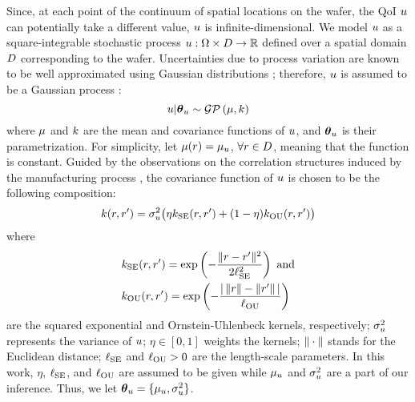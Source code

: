 Since, at each point of the continuum of spatial locations on the wafer, the QoI $u$ can potentially take a different value, $u$ is infinite-dimensional. We model $u$ as a square-integrable stochastic process $u: \Omega \times D \to \mathbb{R}$ defined over a spatial domain $D$ corresponding to the wafer. Uncertainties due to process variation are known to be well approximated using Gaussian distributions \cite{srivastava2010}; therefore, $u$ is assumed to be a Gaussian process \cite{rasmussen2006}:
\[
  \u | \vparam_\u \sim \gaussianp{\fMean}{\fCov}
\]
where $\fMean$ and $\fCov$ are the mean and covariance functions of $u$, and ${\boldsymbol\theta}_u$ is their parametrization. For simplicity, let $\fMean{\r} = \mu_\u$, $\forall r \in D$, meaning that the function is constant. Guided by the observations on the correlation structures induced by the manufacturing process \cite{cheng2011}, the covariance function of $u$ is chosen to be the following composition:
\begin{equation} \elabel{covariance-function}
  \fCov{\r, \r'} = \sigma_\u^2 \big( \eta \fCov_\SE(\r, \r') + (1 - \eta) \fCov_\OU(\r, \r') \big)
\end{equation}
where
\begin{align*}
  & \fCov_\SE(\r, \r') = \exp\left(-\frac{\norm{\r - \r'}^2}{2 \ell_\SE^2}\right) \text{ and} \\
  & \fCov_\OU(\r, \r') = \exp\left(- \frac{\abs{\,\norm{\r} - \norm{\r'}\,}}{\ell_\OU} \right)
\end{align*}
are the squared exponential and Ornstein-Uhlenbeck kernels, respectively; $\sigma_u^2$ represents the variance of $u$; $\eta \in [0, 1]$ weights the kernels; $\| \cdot \|$ stands for the Euclidean distance; $\ell_{\text{SE}}$ and $\ell_{\text{OU}} > 0$ are the length-scale parameters. In this work, $\eta$, $\ell_{\text{SE}}$, and $\ell_{\text{OU}}$ are assumed to be given while $\mu_u$ and $\sigma^2_u$ are a part of our inference. Thus, we let ${\boldsymbol\theta}_u = \{ \mu_u, \sigma_u^2 \}$.


